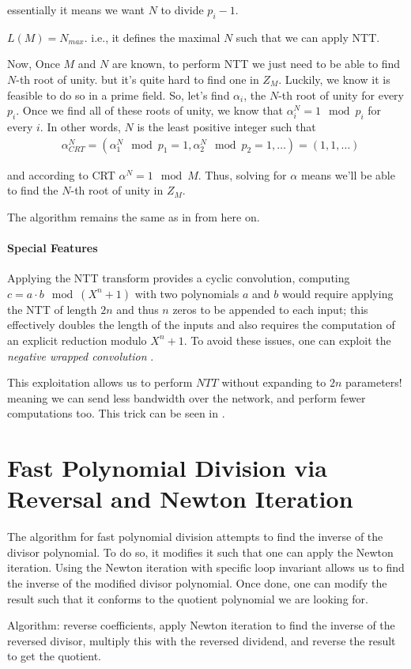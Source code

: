 essentially it means we want $ N$ to divide $p_i-1$.

\begin{corollary}
  $L(M)=N_{max}$. i.e., it defines the maximal $N$ 
  such that we can apply NTT.  
\end{corollary}

Now, Once $M$ and $N$ are known, to perform NTT we just need to be able to find 
$N$-th root of unity. but it's quite hard to find one in $Z_M$.
Luckily, we know it is feasible to do so in a prime field. 
So, let's find $\alpha_i$, the $N$-th root of unity for every $p_i$.
Once we find all of these roots of unity, we know that $\alpha_i^N=1 \mod p_i$ for every $i$.
In other words, $N$ is the least positive integer such that
\begin{align*}
  &\alpha_{CRT}^N = (\alpha_1^N \mod p_1=1, \alpha_2^N \mod p_2=1,\dots)= (1,1,\dots)
\end{align*}

and according to CRT $\alpha^N=1 \mod M$. Thus, solving for $\alpha$ 
means we'll be able to find the $N$-th root of unity in $Z_M$.

The algorithm remains the same as in  from here on.

\paragraph{Special Features}
Applying the NTT transform provides a cyclic convolution, computing 
$c = a \cdot b \mod (X^n + 1)$  with two polynomials $a$ and $b$ would require 
applying the NTT of length $2n$ and thus $n$ zeros to be appended to each input;
this effectively doubles the length of the inputs and also requires the computation of 
an explicit reduction modulo $X^n +1$. 
To avoid these issues, one can exploit the \emph{negative wrapped convolution} \cite{negantt}.

This exploitation allows us to perform $NTT$ without expanding to $2n$ parameters!
meaning we can send less bandwidth over the network, and perform fewer computations too. 
This trick can be seen in \cite{SEAL}.

\section{Fast Polynomial Division via Reversal and Newton Iteration}
\begin{insight}
The algorithm for fast polynomial division attempts to find the inverse of the divisor polynomial. To do so, it modifies it such that one can apply the Newton iteration.
Using the Newton iteration with specific loop invariant allows us to find the inverse of the modified divisor polynomial. 
Once done, one can modify the result such that it conforms to the quotient polynomial we are looking for.

Algorithm: reverse coefficients, apply Newton iteration to find the inverse of the reversed divisor, multiply this with the reversed dividend, and reverse the result to get the quotient.
\end{insight}

